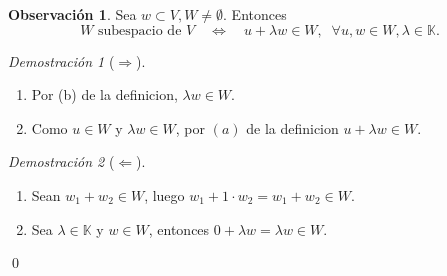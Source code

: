 \documentclass{article}
\theoremstyle{definition}
\theoremstyle{definition}
\newtheorem*{obs}{Observación}
\theoremstyle{remark}
\newtheorem*{demo}{Demostración}
\begin{document}
\begin{obs}
  Sea $w \subset V,W \neq \emptyset$. Entonces \[
    W \text{ subespacio de } V \quad \Leftrightarrow \quad u+\lambda w \in W, \; \; \forall u,w \in W, \lambda \in \mathbb{K}.
  \]
  \end{obs}\begin{demo}[$\Rightarrow$] \;
  \begin{enumerate}[label=\phantom{(}$\circ$\phantom{)}]  
\item  Por (b) de la definicion, $\lambda w \in W$. 
\item Como $u \in W$ y $\lambda w \in W$, por $(a)$ de la definicion $u+\lambda w \in W$. 
\end{enumerate}
\end{demo}
\begin{demo}[$\Leftarrow$]\;
  \begin{enumerate}[label=(\alph*)]
    \item Sean $w_1+w_2 \in W$, luego $w_1+1\cdot w_2 = w_1 + w_2 \in W$. 
    \item Sea $\lambda \in \mathbb{K}$ y $w \in W$, entonces $0 + \lambda w = \lambda w \in W$.
  \end{enumerate}
\end{demo}
\qed
\pagebreak
\end{document}

